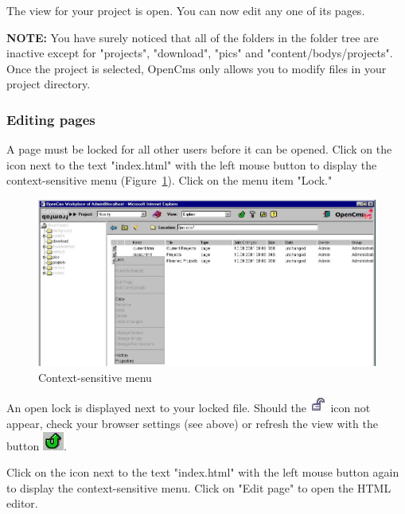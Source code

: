 The view for your project is open. You can now edit any one of its pages.

\textbf{NOTE:} You have surely noticed that all of the folders in
the folder tree are inactive except for "projects", "download",
"pics" and "content/bodys/projects". Once the project is selected,
OpenCms only allows you to modify files in your project directory.

\subsubsection{Editing pages}

A page must be locked for all other users before it can be opened.
Click on the icon next to the text "index.html" with the left
mouse button to display the context-sensitive menu
(Figure~\ref{lockpage}). Click on the menu item "Lock."

\begin{figure}[h]
\begin{center}
\includegraphics[width=\sgw]
                   {pics/usermanual/pageMenuUnlocked}
\caption[Context-sensitive menu]
           {Context-sensitive menu}
\label{lockpage}
\end{center}
\end{figure}

An open lock is displayed next to your locked file. Should the
\includegraphics{pics/usermanual/ic_locked}
icon not appear, check your browser settings (see above) or
refresh the view with the button
\includegraphics{pics/usermanual/ic_refresh}.

Click on the icon next to the text "index.html" with the left
mouse button again to display the context-sensitive menu. Click on
"Edit page" to open the HTML editor.

